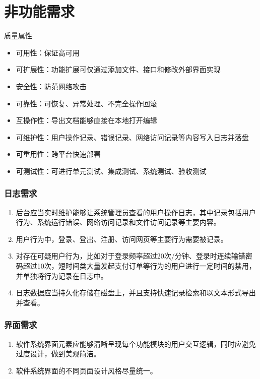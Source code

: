 \section{非功能需求}
    \begin{frame}{质量属性}
        \begin{itemize}
            \item 可用性：保证高可用
            \item 可扩展性：功能扩展可仅通过添加文件、接口和修改外部界面实现
            \item 安全性：防范网络攻击
            \item 可靠性：可恢复、异常处理、不完全操作回滚
            \item 互操作性：导出文档能够直接在本地打开编辑
            \item 可维护性：用户操作记录、错误记录、网络访问记录等内容写入日志并落盘
            \item 可重用性：跨平台快速部署
            \item 可测试性：可进行单元测试、集成测试、系统测试、验收测试
        \end{itemize}
    \end{frame}

    \begin{frame}
        \frametitle{日志需求}
        \begin{enumerate}
            \item 后台应当实时维护能够让系统管理员查看的用户操作日志，其中记录包括用户行为、系统运行错误、网络访问记录和文件访问记录等主要内容。
            \item 用户行为中，登录、登出、注册、访问网页等主要行为需要被记录。
            \item 对存在可疑用户行为，比如对于登录频率超过20次/分钟、登录时连续输错密码超过10次，短时间类大量发起支付订单等行为的用户进行一定时间的禁用，并单独将行为记录在日志中。
            \item 日志数据应当持久化存储在磁盘上，并且支持快速记录检索和以文本形式导出并查看。
        \end{enumerate}
    \end{frame}

    \begin{frame}
        \frametitle{界面需求}
        \begin{enumerate}
            \item 软件系统界面元素应能够清晰呈现每个功能模块的用户交互逻辑，同时应避免过度设计，做到美观简洁。
            \item 软件系统界面的不同页面设计风格尽量统一。
        \end{enumerate}
    \end{frame}

